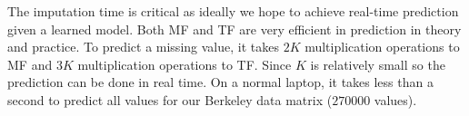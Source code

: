 The imputation time is critical as ideally we hope to achieve real-time prediction given a learned model. 
Both MF and TF are very efficient in prediction in theory and practice.
To predict a missing value, it takes $2K$ multiplication operations to MF and $3K$ multiplication operations to TF.
Since $K$ is relatively small so the prediction can be done in real time.
On a normal laptop, it takes less than a second to predict all values for our Berkeley data matrix ($270000$ values).

